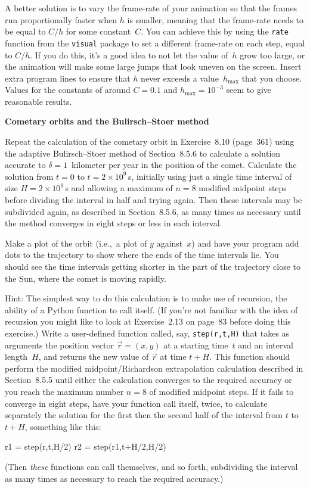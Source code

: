 \documentclass[12pt]{article}
\begin{document}
\begin{exercises}
A better solution is to vary the frame-rate of your animation so that the
frames run proportionally faster when $h$ is smaller, meaning that the
frame-rate needs to be equal to $C/h$ for some constant~$C$.  You can
achieve this by using the \verb|rate| function from the
\verb|visual| package to set a different frame-rate on each step, equal to
$C/h$.  If you do this, it's a good idea to not let the value of~$h$ grow
too large, or the animation will make some large jumps that look uneven on
the screen.  Insert extra program lines to ensure that $h$ never exceeds a
value~$h_\textrm{max}$ that you choose.  Values for the constants of around
$C=0.1$ and $h_\textrm{max}=10^{-3}$ seem to give reasonable results.



\exercise \textbf{Cometary orbits and the Bulirsch--Stoer method}

\exskip Repeat the calculation of the cometary orbit in Exercise~8.10
(page~361) using the adaptive Bulirsch--Stoer method of Section~8.5.6 to
calculate a solution accurate to $\delta=1$~kilometer per year in the
position of the comet.  Calculate the solution from $t=0$ to
$t=2\times10^9\,$s, initially using just a single time interval of size
$H=2\times10^9\,$s and allowing a maximum of $n=8$ modified midpoint steps
before dividing the interval in half and trying again.  Then these
intervals may be subdivided again, as described in Section~8.5.6, as many
times as necessary until the method converges in eight steps or less in
each interval.

Make a plot of the orbit (i.e.,~a plot of $y$ against~$x$) and have your
program add dots to the trajectory to show where the ends of the time
intervals lie.  You should see the time intervals getting shorter in the
part of the trajectory close to the Sun, where the comet is moving rapidly.

Hint: The simplest way to do this calculation is to make use of recursion,
the ability of a Python function to call itself.  (If you're not familiar
with the idea of recursion you might like to look at Exercise~2.13 on
page~83 before doing this exercise.)  Write a user-defined function called,
say, \verb|step(r,t,H)| that takes as arguments the position vector
$\vec{r} = (x,y)$ at a starting time~$t$ and an interval length~$H$, and
returns the new value of $\vec{r}$ at time $t+H$.  This function should
perform the modified midpoint/Richardson extrapolation calculation
described in Section~8.5.5 until either the calculation converges to the
required accuracy or you reach the maximum number $n=8$ of modified
midpoint steps.  If it fails to converge in eight steps, have your function
call itself, twice, to calculate separately the solution for the first then
the second half of the interval from $t$ to $t+H$, something like this:
\begin{code}
r1 = step(r,t,H/2)
r2 = step(r1,t+H/2,H/2)
\end{code}
(Then \emph{these} functions can call themselves, and so forth, subdividing
the interval as many times as necessary to reach the required accuracy.)



\end{exercises}
\end{document}
